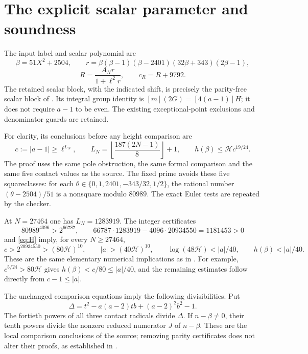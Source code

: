 \documentclass[11pt,a4paper]{article}
\theoremstyle{remark}\newtheorem{remark}[theorem]{Remark}
\newcommand{\HH}{\mathcal H}
\begin{document}
\section{The explicit scalar parameter and soundness}

The input label and scalar polynomial are
\[
 \beta=51X^2+2504,\qquad
 r=\beta(\beta-1)(\beta-2401)(32\beta+343)(2\beta-1),
\]
\[
 R=\frac{A_Nr}{1+\ell^2r},\qquad c_R=R+9792.
\]
The retained scalar block, with the indicated shift, is precisely
the parity-free scalar block of \cite[Sections 4--5]{Quartic317}.
Its integral group identity is
$[m](2G)=[4(a-1)]H$; it does not require $a-1$ to be even.
The existing exceptional-point exclusions and denominator guards
are retained.

For clarity, its conclusions before any height comparison are
\begin{equation}\label{eq:scalar}
 c:=|a-1|\ge\ell^{L_N},\qquad
 L_N=\left\lfloor\frac{187(2N-1)}8\right\rfloor+1,
 \qquad h(\beta)\le\HH c^{19/24}.
\end{equation}
The proof uses the same pole obstruction, the same formal
comparison and the same five contact values as the source.
The fixed prime avoids these five squareclasses: for each
$\theta\in\{0,1,2401,-343/32,1/2\}$, the rational number
$(\theta-2504)/51$ is a nonsquare modulo $80989$.
The exact Euler tests are repeated by the checker.

At $N=27464$ one has $L_N=1283919$. The integer certificates
\[
 80989^{4096}>2^{66787},\qquad
 66787\cdot1283919-4096\cdot20934550=1181453>0
\]
and \eqref{eq:H} imply, for every $N\ge27464$,
\begin{equation}\label{eq:numerical}
 c>2^{20934550}>(80\HH)^{10},\qquad
 |a|>(40\HH)^{10},\qquad
 \log(48\HH)<|a|/40,
 \qquad h(\beta)<|a|/40.
\end{equation}
These are the same elementary numerical implications as in
\cite[Section 4]{Quartic392}. For example,
$c^{5/24}>80\HH$ gives $h(\beta)<c/80\le |a|/40$,
and the remaining estimates follow directly from $c-1\le|a|$.

The unchanged comparison equations imply the following
divisibilities. Put
\[
 \Delta=t^2-a(a-2)tb+(a-2)^2b^2-1.
\]
The fortieth powers of all three contact radicals divide
$\Delta$. If $n-\beta\ne0$, their tenth powers divide the
nonzero reduced numerator $J$ of $n-\beta$. These are the
local comparison conclusions of the source; removing parity
certificates does not alter their proofs, as established in
\cite{Quartic317}.
\end{document}
